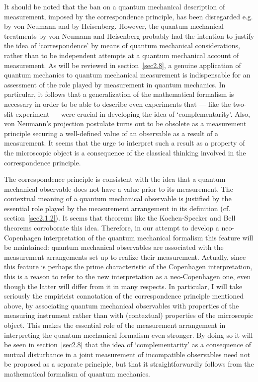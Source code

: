 \documentclass[12pt]{article}
\begin{document}
It should be noted that the ban on a quantum mechanical
description of measurement, imposed by the correspondence
principle, has been disregarded e.g. by von Neumann and by
Heisenberg. However, the quantum mechanical treatments by von
Neumann and Heisenberg probably had the intention to justify the
idea of `correspondence' by means of quantum mechanical
considerations, rather than to be independent attempts at a
quantum mechanical account of measurement. As will be reviewed in
section~\ref{sec2.8}, a genuine application of quantum mechanics
to quantum mechanical measurement is indispensable for an
assessment of the role played by measurement in quantum mechanics.
In particular, it follows that a generalization of the
mathematical formalism is necessary in order to be able to
describe even experiments that --- like the two-slit experiment --- were
crucial in developing the idea of `complementarity'. Also, von
Neumann's projection postulate turns out to be obsolete as a
measurement principle securing a well-defined value of an
observable as a result of a measurement. It seems that the urge to
interpret such a result as a property of the microscopic object is
a consequence of the classical thinking involved in the
correspondence principle.

The correspondence principle is consistent with the idea that a
quantum mechanical observable does not have a value prior to its
measurement. The contextual meaning of a quantum mechanical
observable is justified by the essential role played by the
measurement arrangement in its definition (cf.
section~\ref{sec2.1.2}). It seems that theorems like the
Kochen-Specker and Bell theorems corroborate this idea. Therefore,
in our attempt to develop a neo-Copenhagen interpretation of the
quantum mechanical formalism this feature will be maintained:
quantum mechanical observables are associated with the measurement
arrangements set up to realize their measurement. Actually, since
this feature is perhaps the prime characteristic of the Copenhagen
interpretation, this is a reason to refer to the new
interpretation as a neo-Copenhagen one, even though the latter
will differ from it in many respects. In particular, I will take
seriously the empiricist connotation of the correspondence
principle mentioned above, by associating quantum mechanical
observables with properties of the measuring instrument rather
than with (contextual) properties of the microscopic object. This
makes the essential role of the measurement arrangement in
interpreting the quantum mechanical formalism even stronger. By
doing so it will be seen in section~\ref{sec2.8} that the idea of
`complementarity' as a consequence of mutual disturbance in a
joint measurement of incompatible observables need not be proposed
as a separate principle, but that it straightforwardly follows
from the mathematical formalism of quantum mechanics.
\end{document}
